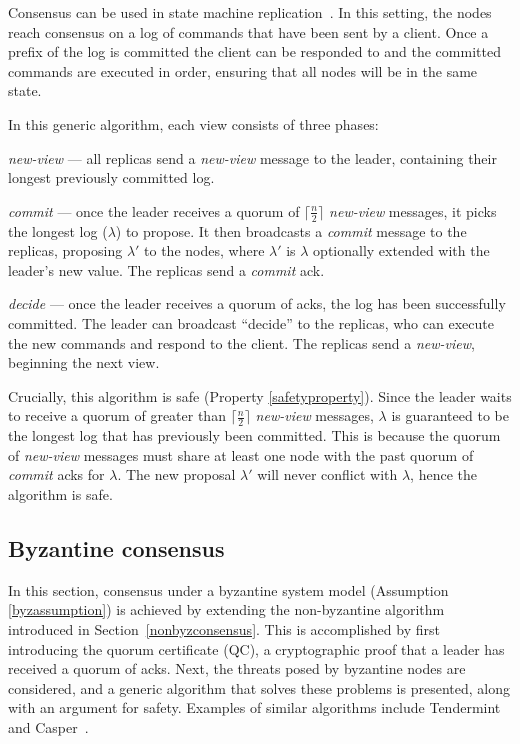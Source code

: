 Consensus can be used in state machine replication~\cite{lamportTimeClocksOrdering1978,schneiderImplementingFaulttolerantServices1990}. In this setting, the nodes reach consensus on a log of commands that have been sent by a client. Once a prefix of the log is committed the client can be responded to and the committed commands are executed in order, ensuring that all nodes will be in the same state.

In this generic algorithm, each view consists of three phases:

\begin{description}
	\item \textit{new-view} --- all replicas send a \textit{new-view} message to the leader, containing their longest previously committed log.
	\item \textit{commit} --- once the leader receives a quorum of $\lceil\frac{n}{2}\rceil$ \textit{new-view} messages, it picks the longest log ($\lambda$) to propose. It then broadcasts a \textit{commit} message to the replicas, proposing $\lambda'$ to the nodes, where $\lambda'$ is $\lambda$ optionally extended with the leader's new value. The replicas send a \textit{commit} ack.
	\item \textit{decide} --- once the leader receives a quorum of acks, the log has been successfully committed. The leader can broadcast ``decide'' to the replicas, who can execute the new commands and respond to the client. The replicas send a \textit{new-view}, beginning the next view.
\end{description}

Crucially, this algorithm is safe (Property \ref{safetyproperty}). Since the leader waits to receive a quorum of greater than $\lceil\frac{n}{2}\rceil$ \textit{new-view} messages, $\lambda$ is guaranteed to be the longest log that has previously been committed. This is because the quorum of \textit{new-view} messages must share at least one node with the past quorum of \textit{commit} acks for $\lambda$. The new proposal $\lambda'$ will never conflict with $\lambda$, hence the algorithm is safe.

\subsection{Byzantine consensus} \label{byzconsensus}
In this section, consensus under a byzantine system model (Assumption \ref{byzassumption}) is achieved by extending the non-byzantine algorithm introduced in Section~\ref{nonbyzconsensus}. This is accomplished by first introducing the quorum certificate (QC), a cryptographic proof that a leader has received a quorum of acks. Next, the threats posed by byzantine nodes are considered, and a generic algorithm that solves these problems is presented, along with an argument for safety. Examples of similar algorithms include Tendermint~\cite{kwonTendermintConsensusMining2014} and Casper~\cite{buterinCasperFriendlyFinality2019}.

